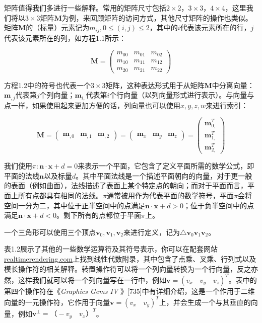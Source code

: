 \documentclass[
  paper=a4,
  ,captions=tableheading
]{scrartcl}
\begin{document}
矩阵值得我们多进行一些解释。常用的矩阵尺寸包括\(2 \times 2\)，\(3 \times 3\)，\(4 \times 4\)，这里我们将以\(3 \times 3\)矩阵\(\mathbf{M}\)为例，来回顾矩阵的访问方式，其他尺寸矩阵的操作也类似。矩阵\(\mathbf{M}\)的（标量）元素记为\(m_{ij}, 0 \le (i, j) \le 2\)，其中的\(i\)代表该元素所在的行，\(j\)代表该元素所在的列，如方程1.1所示：

\[
\mathbf{M} = 
\left( \begin{array}{} 
m_{00} & m_{01} & m_{02} \\ 
m_{10} & m_{11} & m_{12} \\
 m_{20} & m_{21} & m_{22}  
\end{array} \right) \tag{1.1}
\]

方程1.2中的符号也代表一个\(3 \times 3\)矩阵，这种表达形式用于从矩阵\(\mathbf{M}\)中分离向量：\(\mathbf{m}_{,j}\)代表第\(j\)个列向量；\(\mathbf{m}_{i,}\)代表第\(i\)个行向量（以列向量形式进行表示）。与向量与点一样，如果使用起来更加方便的话，列向量也可以使用\(x, y, z, w\)来进行索引：

\[
\mathbf{M}=\left(\begin{array}{lll}\mathbf{m}_{, 0} & \mathbf{m}_{, 1} & \mathbf{m}_{, 2}\end{array}\right)=\left(\begin{array}{lll}\mathbf{m}_{x} & \mathbf{m}_{y} & \mathbf{m}_{z}\end{array}\right)=\left(\begin{array}{c}\mathbf{m}_{0,}^{T} \\[2mm] \mathbf{m}_{1,}^{T} \\[2mm] \mathbf{m}_{2,}^{T}\end{array}\right)
\tag{1.2} 
\]

我们使用\(\pi :\mathbf{n} \cdot \mathbf{x} + d = 0\)来表示一个平面，它包含了定义平面所需的数学公式，即平面的法线\(\mathbf{n}\)以及标量\(d\)。其中平面法线是一个描述平面朝向的向量，对于更一般的表面（例如曲面），法线描述了表面上某个特定点的朝向；而对于平面而言，平面上所有点都具有相同的法线。\(\pi\)通常被用作为代表平面的数学符号，平面\(\pi\)会将空间一分为二，其中位于正半空间中的点满足\(\mathbf{n} \cdot \mathbf{x} + d > 0\)；位于负半空间中的点满足\(\mathbf{n} \cdot \mathbf{x} + d < 0\)。剩下所有的点都位于平面\(\pi\)上。

一个三角形可以使用三个顶点\(\mathbf{v}_0, \mathbf{v}_1, \mathbf{v}_2\)来进行定义，记为\(\triangle \mathbf{v}_0 \mathbf{v}_1 \mathbf{v}_2\)。

表1.2展示了其他的一些数学运算符及其符号表示，你可以在配套网站\href{http://realtimerendering.com/}{realtimerendering.com}上找到线性代数附录，其中包含了点乘、叉乘、行列式以及模长操作符的相关解释。转置操作符可以将一个列向量转换为一个行向量，反之亦然，这样我们就可以将一个列向量写在一行中，例如\(\mathbf{v} = (v_x \quad v_y \quad v_z)^T\)。表中的第四个操作符在《\emph{Graphics
Gems IV}
》{[}735{]}中有详细介绍，这是一个作用于二维向量的一元操作符，它作用于向量\(\mathbf{v} = (v_x \quad v_y)^T\)上，并会生成一个与其垂直的向量，例如\(\mathbf{v}^\perp = （-v_y \quad v_x）^T\)。
\end{document}

